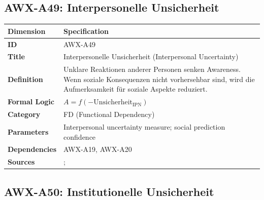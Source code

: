 
\subsection{AWX-A49: Interpersonelle Unsicherheit}

\begin{table}[htbp]
\small
\begin{tabular}{p{3cm}p{11cm}}
\toprule
\textbf{Dimension} & \textbf{Specification} \\
\midrule
\textbf{ID} & AWX-A49 \\
\textbf{Title} & Interpersonelle Unsicherheit (Interpersonal Uncertainty) \\
\textbf{Definition} & Unklare Reaktionen anderer Personen senken Awareness. Wenn soziale Konsequenzen nicht vorhersehbar sind, wird die Aufmerksamkeit für soziale Aspekte reduziert. \\
\textbf{Formal Logic} & $A = f(-\text{Unsicherheit}_{\text{IPN}})$ \\
\textbf{Category} & FD (Functional Dependency) \\
\textbf{Parameters} & Interpersonal uncertainty measure; social prediction confidence \\
\textbf{Dependencies} & AWX-A19, AWX-A20 \\
\textbf{Sources} & \citet{fehr2004social}; \citet{bohnet2004trust} \\
\bottomrule
\end{tabular}
\end{table}


\subsection{AWX-A50: Institutionelle Unsicherheit}

